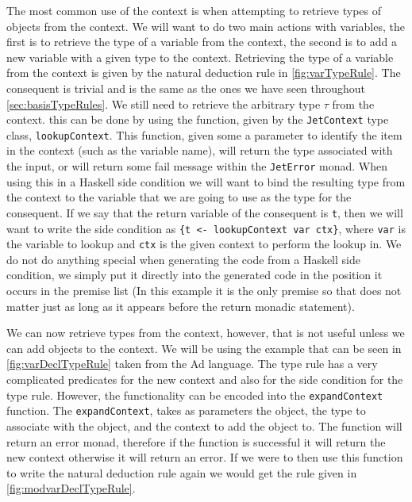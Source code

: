 The most common use of the context is when attempting to retrieve types of objects from the context.
We will want to do two main actions with variables, the first is to retrieve the type of a variable from the context, the second is to add a new variable with a given type to the context.
Retrieving the type of a variable from the context is given by the natural deduction rule in \autoref{fig:varTypeRule}.
The consequent is trivial and is the same as the ones we have seen throughout \autoref{sec:basisTypeRules}.
We still need to retrieve the arbitrary type $\tau$ from the context.
this can be done by using the function, given by the \texttt{JetContext} type class, \texttt{lookupContext}.
This function, given some a parameter to identify the item in the context (such as the variable name), will return the type associated with the input, or will return some fail message within the \texttt{JetError} monad.
When using this in a Haskell side condition we will want to bind the resulting type from the context to the variable that we are going to use as the type for the consequent.
If we say that the return variable of the consequent is \texttt{t}, then we will want to write the side condition as \texttt{\{t <- lookupContext var ctx\}}, where \texttt{var} is the variable to lookup and \texttt{ctx} is the given context to perform the lookup in.
We do not do anything special when generating the code from a Haskell side condition, we simply put it directly into the generated code in the position it occurs in the premise list (In this example it is the only premise so that does not matter just as long as it appears before the return monadic statement).

We can now retrieve types from the context, however, that is not useful unless we can add objects to the context.
We will be using the example that can be seen in \autoref{fig:varDeclTypeRule} taken from the Ad language.
The type rule has a very complicated predicates for the new context and also for the side condition for the type rule.
However, the functionality can be encoded into the \texttt{expandContext} function.
The \texttt{expandContext}, takes as parameters the object, the type to associate with the object, and the context to add the object to.
The function will return an error monad, therefore if the function is successful it will return the new context otherwise it will return an error.
If we were to then use this function to write the natural deduction rule again we would get the rule given in \autoref{fig:modvarDeclTypeRule}.

